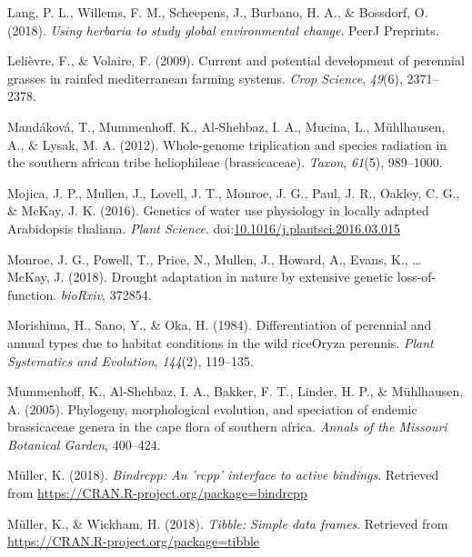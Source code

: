\documentclass[man,floatsintext]{apa6}
\theoremstyle{definition}
\theoremstyle{definition}
\theoremstyle{definition}
\theoremstyle{remark}
\begin{document}
\leavevmode\hypertarget{ref-lang2018using}{}%
Lang, P. L., Willems, F. M., Scheepens, J., Burbano, H. A., \& Bossdorf,
O. (2018). \emph{Using herbaria to study global environmental change}.
PeerJ Preprints.

\leavevmode\hypertarget{ref-lelievre2009current}{}%
Lelièvre, F., \& Volaire, F. (2009). Current and potential development
of perennial grasses in rainfed mediterranean farming systems.
\emph{Crop Science}, \emph{49}(6), 2371--2378.

\leavevmode\hypertarget{ref-mandakova2012whole}{}%
Mandáková, T., Mummenhoff, K., Al-Shehbaz, I. A., Mucina, L.,
Mühlhausen, A., \& Lysak, M. A. (2012). Whole-genome triplication and
species radiation in the southern african tribe heliophileae
(brassicaceae). \emph{Taxon}, \emph{61}(5), 989--1000.

\leavevmode\hypertarget{ref-Mojica2016}{}%
Mojica, J. P., Mullen, J., Lovell, J. T., Monroe, J. G., Paul, J. R.,
Oakley, C. G., \& McKay, J. K. (2016). Genetics of water use physiology
in locally adapted Arabidopsis thaliana. \emph{Plant Science}.
doi:\href{https://doi.org/10.1016/j.plantsci.2016.03.015}{10.1016/j.plantsci.2016.03.015}

\leavevmode\hypertarget{ref-monroe2018drought}{}%
Monroe, J. G., Powell, T., Price, N., Mullen, J., Howard, A., Evans, K.,
\ldots{} McKay, J. (2018). Drought adaptation in nature by extensive
genetic loss-of-function. \emph{bioRxiv}, 372854.

\leavevmode\hypertarget{ref-morishima1984differentiation}{}%
Morishima, H., Sano, Y., \& Oka, H. (1984). Differentiation of perennial
and annual types due to habitat conditions in the wild riceOryza
perennis. \emph{Plant Systematics and Evolution}, \emph{144}(2),
119--135.

\leavevmode\hypertarget{ref-mummenhoff2005phylogeny}{}%
Mummenhoff, K., Al-Shehbaz, I. A., Bakker, F. T., Linder, H. P., \&
Mühlhausen, A. (2005). Phylogeny, morphological evolution, and
speciation of endemic brassicaceae genera in the cape flora of southern
africa. \emph{Annals of the Missouri Botanical Garden}, 400--424.

\leavevmode\hypertarget{ref-R-bindrcpp}{}%
Müller, K. (2018). \emph{Bindrcpp: An 'rcpp' interface to active
bindings}. Retrieved from
\url{https://CRAN.R-project.org/package=bindrcpp}

\leavevmode\hypertarget{ref-R-tibble}{}%
Müller, K., \& Wickham, H. (2018). \emph{Tibble: Simple data frames}.
Retrieved from \url{https://CRAN.R-project.org/package=tibble}
\end{document}
